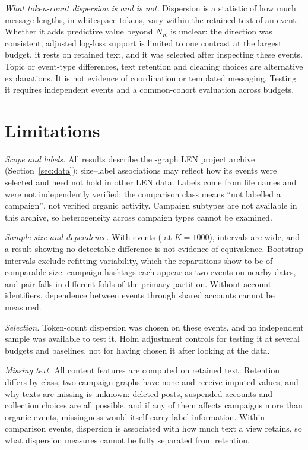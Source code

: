 \documentclass[conference]{IEEEtran}
\newcommand{\NK}{N_K}
\begin{document}
\emph{What token-count dispersion is and is not.} Dispersion is a statistic of how much message lengths, in whitespace tokens, vary within the retained text of an event. Whether it adds predictive value beyond $\NK$ is unclear: the direction was consistent, adjusted log-loss support is limited to one contrast at the largest budget, it rests on retained text, and it was selected after inspecting these events. Topic or event-type differences, text retention and cleaning choices are alternative explanations. It is not evidence of coordination or templated messaging. Testing it requires independent events and a common-cohort evaluation across budgets.

\section{Limitations}\label{sec:limitations}
\emph{Scope and labels.} All results describe the \RNEvents-graph LEN project archive (Section~\ref{sec:data}); size--label associations may reflect how its events were selected and need not hold in other LEN data. Labels come from file names and were not independently verified; the comparison class means ``not labelled a campaign'', not verified organic activity. Campaign subtypes are not available in this archive, so heterogeneity across campaign types cannot be examined.

\emph{Sample size and dependence.} With \RNEvents{} events (\REligThousand{} at $K=1000$), intervals are wide, and a result showing no detectable difference is not evidence of equivalence. Bootstrap intervals exclude refitting variability, which the repartitions show to be of comparable size. \RHashtagPairsCap{} campaign hashtags each appear as two events on nearby dates, and \RHashtagPairsSplit{} pair falls in different folds of the primary partition. Without account identifiers, dependence between events through shared accounts cannot be measured.

\emph{Selection.} Token-count dispersion was chosen on these events, and no independent sample was available to test it. Holm adjustment controls for testing it at several budgets and baselines, not for having chosen it after looking at the data.

\emph{Missing text.} All content features are computed on retained text. Retention differs by class, two campaign graphs have none and receive imputed values, and why texts are missing is unknown: deleted posts, suspended accounts and collection choices are all possible, and if any of them affects campaigns more than organic events, missingness would itself carry label information. Within comparison events, dispersion is associated with how much text a view retains, so what dispersion measures cannot be fully separated from retention.
\end{document}
